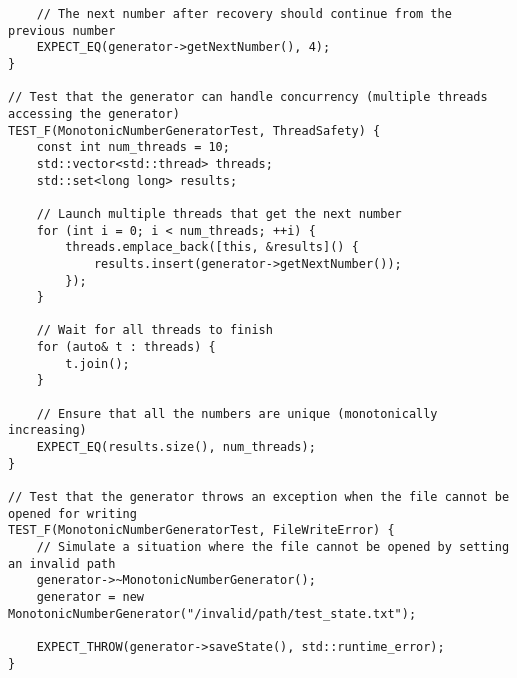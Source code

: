 \begin{verbatim}
    // The next number after recovery should continue from the previous number
    EXPECT_EQ(generator->getNextNumber(), 4);
}

// Test that the generator can handle concurrency (multiple threads accessing the generator)
TEST_F(MonotonicNumberGeneratorTest, ThreadSafety) {
    const int num_threads = 10;
    std::vector<std::thread> threads;
    std::set<long long> results;

    // Launch multiple threads that get the next number
    for (int i = 0; i < num_threads; ++i) {
        threads.emplace_back([this, &results]() {
            results.insert(generator->getNextNumber());
        });
    }

    // Wait for all threads to finish
    for (auto& t : threads) {
        t.join();
    }

    // Ensure that all the numbers are unique (monotonically increasing)
    EXPECT_EQ(results.size(), num_threads);
}

// Test that the generator throws an exception when the file cannot be opened for writing
TEST_F(MonotonicNumberGeneratorTest, FileWriteError) {
    // Simulate a situation where the file cannot be opened by setting an invalid path
    generator->~MonotonicNumberGenerator();
    generator = new MonotonicNumberGenerator("/invalid/path/test_state.txt");

    EXPECT_THROW(generator->saveState(), std::runtime_error);
} \end{verbatim}